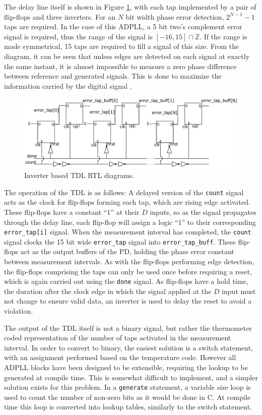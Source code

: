 The delay line itself is shown in Figure \ref{fig:tdl_impl}, with each tap implemented by a pair of flip-flops and three inverters. For an $N$ bit width phase error detection, $2^{N-1}-1$ taps are required. In the case of this \ac{ADPLL}, a 5 bit two's complement error signal is required, thus the range of the signal is $[-16,15]\cap\mathbb{Z}$. If the range is made symmetrical, 15 taps are required to fill a signal of this size. From the diagram, it can be seen that unless edges are detected on each signal at exactly the same instant, it is almost impossible to measure a zero phase difference between reference and generated signals. This is done to maximize the information carried by the digital signal \cite{shan2014phd}.
\begin{figure}[h]
    \centering
    \includegraphics[width=1.0\textwidth]{../new_pdet2}
    \caption[Inverter based \ac{TDL} RTL diagrams]{Inverter based \ac{TDL} RTL diagrams.}
    \label{fig:tdl_impl}
\end{figure}
The operation of the \ac{TDL} is as follows: A delayed version of the \texttt{count} signal acts as the clock for flip-flops forming each tap, which are rising edge activated. These flip-flops have a constant ``1'' at their $D$ inputs, so as the signal propagates through the delay line, each flip-flop will assign a logic ``1'' to their corresponding \texttt{error\_tap[i]} signal. When the measurement interval has completed, the \texttt{count} signal clocks the 15 bit wide \texttt{error\_tap} signal into \texttt{error\_tap\_buff}. These flip-flops act as the output buffers of the \ac{PD}, holding the phase error constant between measurement intervals. As with the flip-flops performing edge detection, the flip-flops comprising the taps can only be used once before requiring a reset, which is again carried out using the \texttt{done} signal. As flip-flops have a hold time, the duration after the clock edge in which the signal applied at the $D$ input must not change to ensure valid data, an inverter is used to delay the reset to avoid a violation.

The output of the \ac{TDL} itself is not a binary signal, but rather the thermometer coded representation of the number of taps activated in the measurement interval. In order to convert to binary, the easiest solution is a switch statement, with an assignment performed based on the temperature code. However all \ac{ADPLL} blocks have been designed to be extensible, requiring the lookup to be generated at compile time. This is somewhat difficult to implement, and a simpler solution exists for this problem. In a \texttt{generate} statement, a variable size loop is used to count the number of non-zero bits as it would be done in C. At compile time this loop is converted into lookup tables, similarly to the switch statement.

